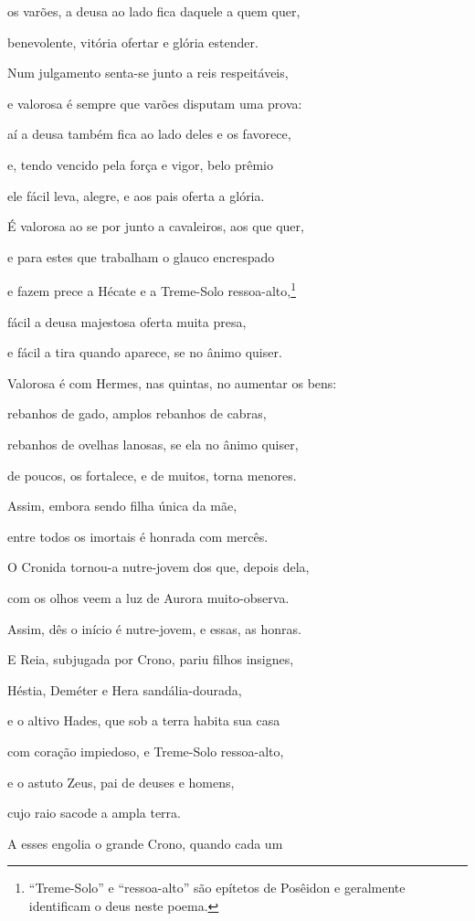\begin{pages}
\begin{Rightside}
os varões, a deusa ao lado fica daquele a quem quer,

benevolente, vitória ofertar e glória estender.

Num julgamento senta-se junto a reis respeitáveis,

e valorosa é sempre que varões disputam uma prova: 

aí a deusa também fica ao lado deles e os favorece,

e, tendo vencido pela força e vigor, belo prêmio

ele fácil leva, alegre, e aos pais oferta a glória.

É valorosa ao se por junto a cavaleiros, aos que quer,

e para estes que trabalham o glauco encrespado 

e fazem prece a Hécate e a Treme-Solo ressoa-alto,\footnote{``Treme-Solo'' e ``ressoa-alto'' são epítetos de Posêidon e geralmente identificam o deus neste poema.}

fácil a deusa majestosa oferta muita presa,

e fácil a tira quando aparece, se no ânimo quiser.

Valorosa é com Hermes, nas quintas, no aumentar os bens:

rebanhos de gado, amplos rebanhos de cabras, 

rebanhos de ovelhas lanosas, se ela no ânimo quiser,

de poucos, os fortalece, e de muitos, torna menores.

Assim, embora sendo filha única da mãe,

entre todos os imortais é honrada com mercês.

O Cronida tornou-a nutre-jovem dos que, depois dela, 

com os olhos veem a luz de Aurora muito-observa.

Assim, dês o início é nutre-jovem, e essas, as honras.

\medskip

E Reia, subjugada por Crono, pariu filhos insignes,

Héstia, Deméter e Hera sandália-dourada,

e o altivo Hades, que sob a terra habita sua casa 

com coração impiedoso, e Treme-Solo ressoa-alto,

e o astuto Zeus, pai de deuses e homens,

cujo raio sacode a ampla terra.

A esses engolia o grande Crono, quando cada um


\end{Rightside}
\end{pages}
